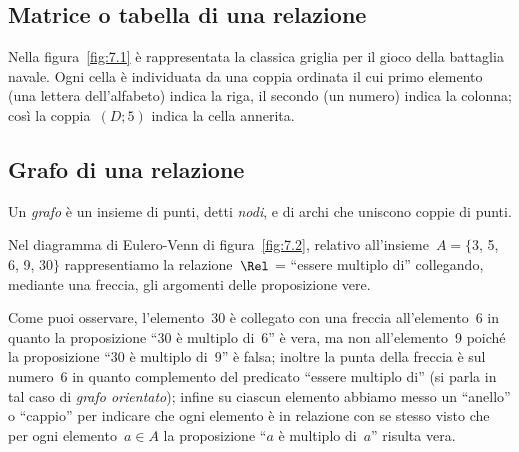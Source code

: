 \ovalbox{\risolvii \ref{ese:\thechapter.7}, \ref{ese:\thechapter.8}}

\subsection{Matrice o tabella di una relazione}

Nella figura~\ref{fig:7.1} è rappresentata la classica griglia per il gioco della battaglia navale.
Ogni cella è individuata da una coppia ordinata il cui primo elemento (una lettera dell'alfabeto) indica la riga,
il secondo (un numero) indica la colonna; così la coppia~$(D;5)$ indica la cella annerita.

\ovalbox{\risolvii \ref{ese:\thechapter.9}, \ref{ese:\thechapter.10}, \ref{ese:\thechapter.11}}

\subsection{Grafo di una relazione}

\begin{definizione}
Un \emph{grafo} è un insieme di punti, detti \emph{nodi}, e di archi che uniscono coppie di punti.
\end{definizione}


\begin{exrig}
 \begin{esempio}

Nel diagramma di Eulero-Venn di figura~\ref{fig:7.2}, relativo all'insieme~$A = \{$3, 5, 6, 9, 30$\}$
rappresentiamo la relazione~$\Rel$ = ``essere multiplo di'' collegando, mediante una freccia, gli argomenti delle proposizione vere.

Come puoi osservare, l'elemento~30 è collegato con una freccia all'elemento~6 in quanto la proposizione ``30 è multiplo di~6'' è vera, ma non all'elemento~9
poiché la proposizione ``30 è multiplo di~9'' è falsa; inoltre la punta della freccia è sul numero~6 in quanto complemento del predicato ``essere multiplo di'' (si parla in tal caso di \emph{grafo orientato});
infine su ciascun elemento abbiamo messo un ``anello'' o ``cappio'' per indicare che ogni elemento è in relazione con se stesso visto che per ogni
elemento~$a \in A$ la proposizione ``$a$ è multiplo di~$a$'' risulta vera.

 \end{esempio}
\end{exrig}

